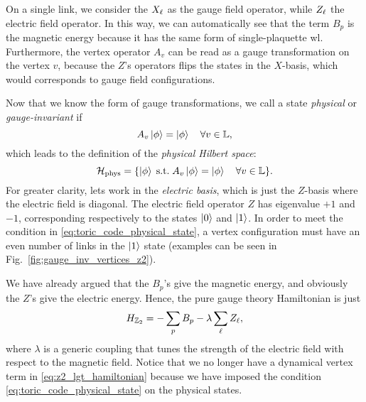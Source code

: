On a single link, we consider the $X_{\ell}$ as the gauge field operator, while $Z_{\ell}$ the electric field operator.
In this way, we can automatically see that the term $B_p$ is the magnetic energy because it has the same form of single-plaquette \ac{wl}.
Furthermore, the vertex operator $A_v$ can be read as a gauge transformation on the vertex $v$, because the $Z$'s operators flips the states in the $X$-basis, which would corresponds to gauge field configurations.

Now that we know the form of gauge transformations, we call a state \emph{physical} or \emph{gauge-invariant} if
\begin{equation}
    A_v \ket{\phi} = \ket{\phi} \quad \forall v \in \mathbb{L},
    \label{eq:toric_code_physical_state}
\end{equation}
which leads to the definition of the \emph{physical Hilbert space}:
\begin{equation}
    \mathcal{H}_{\text{phys}} = \{\ket{\phi} \; \text{s.t.} \; A_v \ket{\phi} = \ket{\phi} \quad \forall v \in \mathbb{L}\}.
    \label{eq:phys_Hilbert_space_toric}
\end{equation}
For greater clarity, lets work in the \emph{electric basis}, which is just the $Z$-basis where the electric field is diagonal.
The electric field operator $Z$ has eigenvalue $+1$ and $-1$, corresponding respectively to the states $\ket{0}$ and $\ket{1}$.
In order to meet the condition in \eqref{eq:toric_code_physical_state}, a vertex configuration must have an even number of links in the $\ket{1}$ state (examples can be seen in Fig.~\ref{fig:gauge_inv_vertices_z2}).

\begin{figure}[t]
\end{figure}

We have already argued that the $B_p$'s give the magnetic energy, and obviously the $Z$'s give the electric energy.
Hence, the pure gauge theory Hamiltonian is just
\begin{equation}
    H_{\mathbb{Z}_2} = - \sum_{p} B_p - \lambda \sum_{\ell} Z_{\ell},
    \label{eq:z2_lgt_hamiltonian}
\end{equation}
where $\lambda$ is a generic coupling that tunes the strength of the electric field with respect to the magnetic field.
Notice that we no longer have a dynamical vertex term in \eqref{eq:z2_lgt_hamiltonian} because we have imposed the condition \eqref{eq:toric_code_physical_state} on the physical states.

